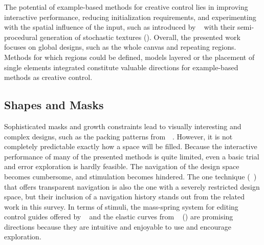 The potential of example-based methods for creative control lies in improving interactive performance, reducing initialization requirements, and experimenting with the spatial influence of the input, such as introduced by \citeauthor*{guehl_2020_stu}~\cite{guehl_2020_stu} with their semi-procedural generation of stochastic textures (). Overall, the presented work focuses on global designs, such as the whole canvas and repeating regions. Methods for which regions could be defined, models layered or the placement of single elements integrated constitute valuable directions for example-based methods as creative control.



\subsection{Shapes and Masks}
\label{subsubsec:analysis_creative_means_shapes}

Sophisticated masks and growth constraints lead to visually interesting and complex designs, such as the packing patterns from~\citeauthor*{saputra_2018_rde}~\cite{saputra_2018_rde}. However, it is not completely predictable exactly how a space will be filled. Because the interactive performance of many of the presented methods is quite limited, even a basic trial and error exploration is hardly feasible. The navigation of the design space becomes cumbersome, and stimulation becomes hindered. The one technique (\citeauthor*{santoni_2016_ggp}~\cite{santoni_2016_ggp}) that offers transparent navigation is also the one with a severely restricted design space, but their inclusion of a navigation history stands out from the related work in this survey. In terms of stimuli, the mass-spring system for editing control guides offered by \citeauthor*{benes_2011_gpm}~\cite{benes_2011_gpm} and the elastic curves from \citeauthor*{zehnder_2016_dso}~\cite{zehnder_2016_dso} () are promising directions because they are intuitive and enjoyable to use and encourage exploration. 

